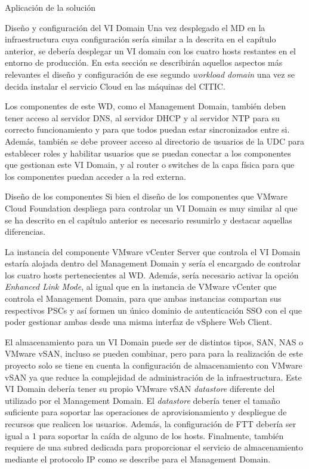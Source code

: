 \begin{chapter}{Aplicación de la solución}
\begin{section}{Diseño y configuración del VI Domain}
    Una vez desplegado el MD en la infraestructura cuya configuración sería similar a la descrita en el capítulo anterior, se debería desplegar un VI domain con los cuatro hosts restantes en el entorno de producción. En esta sección se describirán aquellos aspectos más relevantes el diseño y configuración de ese segundo \textit{workload domain} una vez se decida instalar el servicio Cloud en las máquinas del CITIC.

    Los componentes de este WD, como el Management Domain, también deben tener acceso al servidor DNS, al servidor DHCP y al servidor NTP para su correcto funcionamiento y para que todos puedan estar sincronizados entre si. Además, también se debe proveer acceso al directorio de usuarios de la UDC para establecer roles y habilitar usuarios que se puedan conectar a los componentes que gestionan este VI Domain, y al router o switches de la capa física para que los componentes puedan acceder a la red externa.

    \begin{subsection}{Diseño de los componentes}
        Si bien el diseño de los componentes que VMware Cloud Foundation despliega para controlar un VI Domain es muy similar al que se ha descrito en el capítulo anterior es necesario resumirlo y destacar aquellas diferencias.

        La instancia del componente VMware vCenter Server que controla el VI Domain estaría alojada dentro del Management Domain y sería el encargado de controlar los cuatro hosts pertenecientes al WD. Además, sería necesario activar la opción \textit{Enhanced Link Mode}, al igual que en la instancia de VMware vCenter que controla el Management Domain, para que ambas instancias compartan sus respectivos PSCs y así formen un único dominio de autenticación SSO con el que poder gestionar ambas desde una misma interfaz de vSphere Web Client.

        El almacenamiento para un VI Domain puede ser de distintos tipos, SAN, NAS o VMware vSAN, incluso se pueden combinar, pero para para la realización de este proyecto solo se tiene en cuenta la configuración de almacenamiento con VMware vSAN ya que reduce la complejidad de administración de la infraestructura. Este VI Domain debería tener su propio VMware vSAN \textit{datastore} diferente del utilizado por el Management Domain. El \textit{datastore} debería tener el tamaño suficiente para soportar las operaciones de aprovisionamiento y despliegue de recursos que realicen los usuarios. Además, la configuración de FTT debería ser igual a 1 para soportar la caída de alguno de los hosts. Finalmente, también requiere de una subred dedicada para proporcionar el servicio de almacenamiento mediante el protocolo IP como se describe para el Management Domain.


\end{subsection}
\end{section}
\end{chapter}
